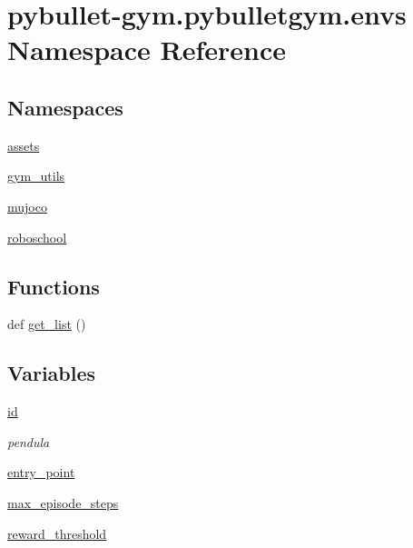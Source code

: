 \hypertarget{namespacepybullet-gym_1_1pybulletgym_1_1envs}{}\section{pybullet-\/gym.pybulletgym.\+envs Namespace Reference}
\label{namespacepybullet-gym_1_1pybulletgym_1_1envs}
\subsection*{Namespaces}
\begin{DoxyCompactItemize}
\item 
 \hyperlink{namespacepybullet-gym_1_1pybulletgym_1_1envs_1_1assets}{assets}
\item 
 \hyperlink{namespacepybullet-gym_1_1pybulletgym_1_1envs_1_1gym__utils}{gym\+\_\+utils}
\item 
 \hyperlink{namespacepybullet-gym_1_1pybulletgym_1_1envs_1_1mujoco}{mujoco}
\item 
 \hyperlink{namespacepybullet-gym_1_1pybulletgym_1_1envs_1_1roboschool}{roboschool}
\end{DoxyCompactItemize}
\subsection*{Functions}
\begin{DoxyCompactItemize}
\item 
def \hyperlink{namespacepybullet-gym_1_1pybulletgym_1_1envs_a99869a350565454b1a4cae3632b5ea04}{get\+\_\+list} ()
\end{DoxyCompactItemize}
\subsection*{Variables}
\begin{DoxyCompactItemize}
\item 
\hyperlink{namespacepybullet-gym_1_1pybulletgym_1_1envs_aed788ed65400b020bab723f70afa3aa3}{id}
\begin{DoxyCompactList}\small\item\em pendula \end{DoxyCompactList}\item 
\hyperlink{namespacepybullet-gym_1_1pybulletgym_1_1envs_ab632306d8a037a84b941b6c650e93397}{entry\+\_\+point}
\item 
\hyperlink{namespacepybullet-gym_1_1pybulletgym_1_1envs_a80ef9a1469c11fe64e4f9af9050a86fc}{max\+\_\+episode\+\_\+steps}
\item 
\hyperlink{namespacepybullet-gym_1_1pybulletgym_1_1envs_a8ccc77f51a77e077c3acb6c6cdceeda3}{reward\+\_\+threshold}
\end{DoxyCompactItemize}


